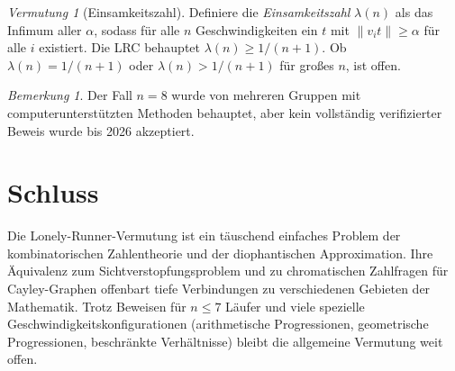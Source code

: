 \documentclass[12pt,a4paper]{amsart}
\theoremstyle{definition}
\theoremstyle{remark}
\newtheorem{vermutung}[theorem]{Vermutung}
\newtheorem{bemerkung}[theorem]{Bemerkung}
\begin{document}
\begin{vermutung}[Einsamkeitszahl]\label{verm:einsamkeitszahl}
Definiere die \emph{Einsamkeitszahl} $\lambda(n)$ als das Infimum aller $\alpha$,
sodass für alle $n$ Geschwindigkeiten ein $t$ mit $\|v_i t\| \geq \alpha$ für alle $i$
existiert. Die LRC behauptet $\lambda(n) \geq 1/(n+1)$.
Ob $\lambda(n) = 1/(n+1)$ oder $\lambda(n) > 1/(n+1)$ für großes $n$, ist offen.
\end{vermutung}

\begin{bemerkung}
Der Fall $n = 8$ wurde von mehreren Gruppen mit computerunterstützten Methoden
behauptet, aber kein vollständig verifizierter Beweis wurde bis 2026 akzeptiert.
\end{bemerkung}

\section{Schluss}

Die Lonely-Runner-Vermutung ist ein täuschend einfaches Problem der kombinatorischen
Zahlentheorie und der diophantischen Approximation. Ihre Äquivalenz zum
Sichtverstopfungsproblem und zu chromatischen Zahlfragen für Cayley-Graphen offenbart
tiefe Verbindungen zu verschiedenen Gebieten der Mathematik. Trotz Beweisen für
$n \leq 7$ Läufer und viele spezielle Geschwindigkeitskonfigurationen (arithmetische
Progressionen, geometrische Progressionen, beschränkte Verhältnisse) bleibt die
allgemeine Vermutung weit offen.
\end{document}
